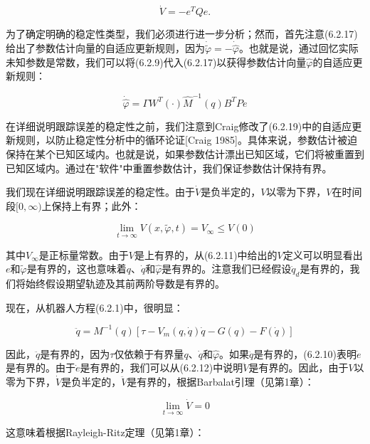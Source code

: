 \documentclass[12pt,a4paper]{ctexart}
\begin{document}
\begin{equation}\label{eq:6.2.18}
\dot{V} = -e^T Q e.
\end{equation}

为了确定明确的稳定性类型，我们必须进行进一步分析；然而，首先注意(6.2.17)给出了参数估计向量的自适应更新规则，因为$\dot{\tilde{\varphi}} = -\dot{\hat{\varphi}}$。也就是说，通过回忆实际未知参数是常数，我们可以将(6.2.9)代入(6.2.17)以获得参数估计向量$\hat{\varphi}$的自适应更新规则：

\begin{equation}\label{eq:6.2.19}
\dot{\hat{\varphi}} = \Gamma W^T(\cdot)\hat{M}^{-1}(q)B^T P e
\end{equation}

在详细说明跟踪误差的稳定性之前，我们注意到Craig修改了(6.2.19)中的自适应更新规则，以防止稳定性分析中的循环论证[Craig 1985]。具体来说，参数估计被迫保持在某个已知区域内。也就是说，如果参数估计漂出已知区域，它们将被重置到已知区域内。通过在"软件"中重置参数估计，我们保证参数估计保持有界。

我们现在详细说明跟踪误差的稳定性。由于$\dot{V}$是负半定的，$V$以零为下界，$V$在时间段$[0, \infty)$上保持上有界；此外：

\begin{equation}
\lim_{t \to \infty} V(x, \tilde{\varphi}, t) = V_\infty \leq V(0)
\end{equation}

其中$V_\infty$是正标量常数。由于$V$是上有界的，从(6.2.11)中给出的$V$定义可以明显看出$e$和$\tilde{\varphi}$是有界的，这也意味着$q$、$\dot{q}$和$\hat{\varphi}$是有界的。注意我们已经假设$\ddot{q}_d$是有界的，我们将始终假设期望轨迹及其前两阶导数是有界的。

现在，从机器人方程(6.2.1)中，很明显：

\begin{equation}
\ddot{q} = M^{-1}(q)[\tau - V_m(q, \dot{q})\dot{q} - G(q) - F(\dot{q})]
\end{equation}

因此，$\ddot{q}$是有界的，因为$\tau$仅依赖于有界量$q$、$\dot{q}$和$\hat{\varphi}$。如果$\ddot{q}$是有界的，(6.2.10)表明$\dot{e}$是有界的。由于$\dot{e}$是有界的，我们可以从(6.2.12)中说明$\ddot{V}$是有界的。因此，由于$V$以零为下界，$\dot{V}$是负半定的，$\ddot{V}$是有界的，根据Barbalat引理（见第1章）：

\begin{equation}\label{eq:6.2.20}
\lim_{t \to \infty} \dot{V} = 0
\end{equation}

这意味着根据Rayleigh-Ritz定理（见第1章）：
\end{document}
